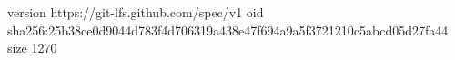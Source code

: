 version https://git-lfs.github.com/spec/v1
oid sha256:25b38ce0d9044d783f4d706319a438e47f694a9a5f3721210c5abcd05d27fa44
size 1270
